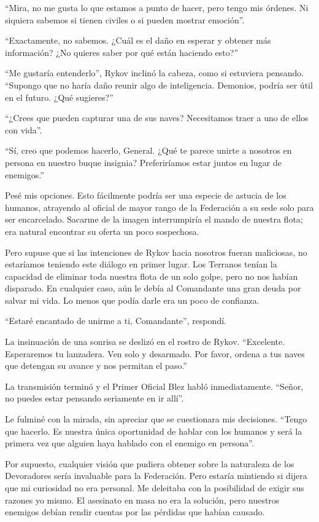 \documentclass[spanish,12pt,a4paper,oneside,titlepage]{book}
\begin{document}
    “Mira, no me gusta lo que estamos a punto de hacer, pero tengo mis órdenes. Ni siquiera sabemos si tienen civiles o si pueden mostrar emoción”.

    “Exactamente, no sabemos. ¿Cuál es el daño en esperar y obtener más información? ¿No quieres saber por qué están haciendo esto?”

    “Me gustaría entenderlo”, Rykov inclinó la cabeza, como si estuviera pensando. “Supongo que no haría daño reunir algo de inteligencia. Demonios, podría ser útil en el futuro. ¿Qué sugieres?”

    “¿Crees que pueden capturar una de sus naves? Necesitamos traer a uno de ellos con vida”.

    ``Sí, creo que podemos hacerlo, General. ¿Qué te parece unirte a nosotros en persona en nuestro buque insignia? Preferiríamos estar juntos en lugar de enemigos.''

    Pesé mis opciones. Esto fácilmente podría ser una especie de astucia de los humanos, atrayendo al oficial de mayor rango de la Federación a su sede solo para ser encarcelado. Sacarme de la imagen interrumpiría el mando de nuestra flota; era natural encontrar su oferta un poco sospechosa.

    Pero supuse que si las intenciones de Rykov hacia nosotros fueran maliciosas, no estaríamos teniendo este diálogo en primer lugar. Los Terranos tenían la capacidad de eliminar toda nuestra flota de un solo golpe, pero no nos habían disparado. En cualquier caso, aún le debía al Comandante una gran deuda por salvar mi vida. Lo menos que podía darle era un poco de confianza.

    “Estaré encantado de unirme a ti, Comandante”, respondí.

    La insinuación de una sonrisa se deslizó en el rostro de Rykov. “Excelente. Esperaremos tu lanzadera. Ven solo y desarmado. Por favor, ordena a tus naves que detengan su avance y nos permitan el paso.”

    La transmisión terminó y el Primer Oficial Blez habló inmediatamente. “Señor, no puedes estar pensando seriamente en ir allí”.

    Le fulminé con la mirada, sin apreciar que se cuestionara mis decisiones. “Tengo que hacerlo. Es nuestra única oportunidad de hablar con los humanos y será la primera vez que alguien haya hablado con el enemigo en persona”.

    Por supuesto, cualquier visión que pudiera obtener sobre la naturaleza de los Devoradores sería invaluable para la Federación. Pero estaría mintiendo si dijera que mi curiosidad no era personal. Me deleitaba con la posibilidad de exigir sus razones yo mismo. El asesinato en masa no era la solución, pero nuestros enemigos debían rendir cuentas por las pérdidas que habían causado.
\end{document}
